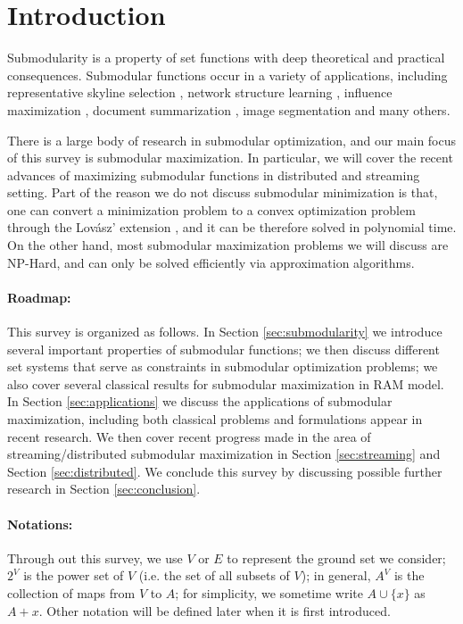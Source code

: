 \section{Introduction}
Submodularity is a property of set functions with deep theoretical and practical consequences. Submodular functions occur in a variety of applications, including representative skyline selection \cite{SLN+11}, network structure learning \cite{GLK10}, influence maximization \cite{KKT03}, document summarization \cite{LB11}, image segmentation \cite{BJM01,KKT09} and many others.


There is a large body of research in submodular optimization, and our main focus of this survey is submodular maximization. In particular, we will cover the recent advances of maximizing submodular functions in distributed and streaming setting. Part of the reason we do not discuss submodular minimization is that, one can convert a minimization problem to a convex optimization problem through the Lov{\'a}sz' extension \cite{L83}, and it can be therefore solved in polynomial time. On the other hand, most submodular maximization problems we will discuss are NP-Hard, and can only be solved efficiently via approximation algorithms.


\paragraph{Roadmap:}
This survey is organized as follows. In Section \ref{sec:submodularity} we introduce several important properties of submodular functions; we then discuss different set systems that serve as constraints in submodular optimization problems; we also cover several classical results for submodular maximization in RAM model. In Section \ref{sec:applications} we discuss the applications of submodular maximization, including both classical problems and formulations appear in recent research. We then cover recent progress made in the area of streaming/distributed submodular maximization in Section \ref{sec:streaming} and Section \ref{sec:distributed}.  We conclude this survey by discussing possible further research in Section \ref{sec:conclusion}.






\paragraph{Notations:}
Through out this survey, we use $V$ or $E$ to represent the ground set we consider; $2^V$ is the power set of $V$ (i.e. the set of all subsets of $V$); in general, $A^V$ is the collection of maps from $V$ to $A$; for simplicity, we sometime write $A \cup \{x\}$ as $A + x$. Other notation will be defined later when it is first introduced.
